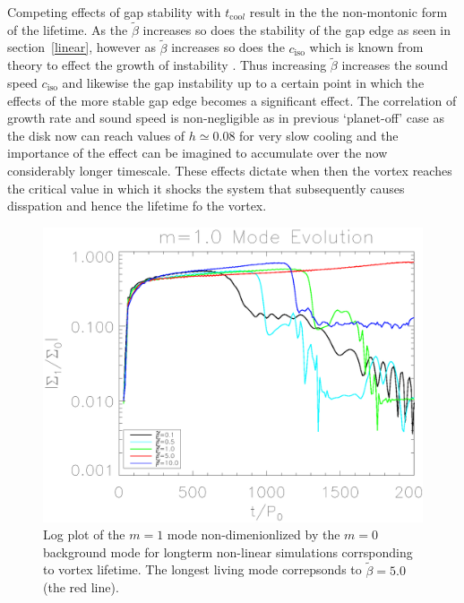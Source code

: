 Competing effects of gap stability with $t_{\mathrm{coo}l}$ result in
the the non-montonic form of the lifetime. As the $\tilde\beta$
increases so does the stability of the gap edge as seen in
section~\ref{linear}, however as $\tilde\beta$ increases so does the
$c_{\mathrm{iso}}$ which is known from theory to effect the growth of
instability \citep{li00}. Thus increasing $\tilde\beta$ increases the
sound speed $c_{\mathrm{iso}}$ and likewise the gap instability up to
a certain point in which the effects of the more stable gap edge
becomes a significant effect. The correlation of growth rate and sound
speed is non-negligible as in previous `planet-off' case as the disk
now can reach values of $h\simeq0.08$ for very slow cooling and the
importance of the effect can be imagined to accumulate over the now
considerably longer timescale. These effects dictate when then the
vortex reaches the critical value in which it shocks the system that
subsequently causes disspation and hence the lifetime fo the vortex. 

\begin{figure}
  \includegraphics[width=\linewidth,clip=true,trim=0.5cm
    0cm 0cm 1cm]{figures/longterm_stability}
  \caption{Log plot of the $m=1$ mode non-dimenionlized by the $m=0$
    background mode for longterm non-linear simulations corrsponding
    to vortex lifetime. The longest living mode correpsonds to
    $\tilde\beta=5.0$ (the red line). \label{lifetimeplot}} 
\end{figure}

